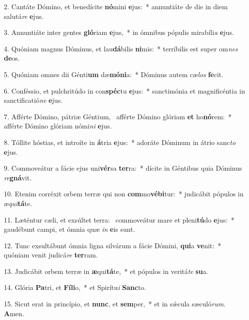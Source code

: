 2. Cantáte Dómino, et benedícite \textbf{nó}mini \textbf{e}jus:~*  annuntiáte de die in diem salutá\textit{re} \textbf{e}jus.\

3. Annuntiáte inter gentes \textbf{gló}riam \textbf{e}jus,~*  in ómnibus pópulis mirabíli\textit{a} \textbf{e}jus.\

4. Quóniam magnus Dóminus, et lau\textbf{dá}bilis \textbf{ni}mis:~*  terríbilis est super om\textit{nes} \textbf{de}os.\

5. Quóniam omnes dii Génti\textbf{um} dæ\textbf{mó}\textbf{ni}a:~*  Dóminus autem cæ\textit{los} \textbf{fe}cit.\

6. Conféssio, et pulchritúdo in con\textbf{spéc}tu \textbf{e}jus:~*  sanctimónia et magnificéntia in sanctificatió\textit{ne} \textbf{e}jus.\

7. Afférte Dómino, pátriæ Géntium, \dag\  afférte Dómino glóriam \textbf{et} ho\textbf{nó}rem:~*  afférte Dómino glóriam nómi\textit{ni} \textbf{e}jus.\

8. Tóllite hóstias, et introíte in \textbf{á}tria \textbf{e}jus:~*  adoráte Dóminum in átrio sanc\textit{to} \textbf{e}jus.\

9. Commoveátur a fácie ejus uni\textbf{vér}sa \textbf{ter}ra:~*  dícite in Géntibus quia Dóminus \textit{re}\textbf{gná}vit.\

10. Etenim corréxit orbem terræ qui non \textbf{com}mo\textbf{vé}\textbf{bi}tur:~*  judicábit pópulos in æ\textit{qui}\textbf{tá}te.\

11. Læténtur cæli, et exsúltet terra: \dag\  commoveátur mare et pleni\textbf{tú}do \textbf{e}jus:~*  gaudébunt campi, et ómnia quæ \textit{in} \textbf{e}is sunt.\

12. Tunc exsultábunt ómnia ligna silvárum a fácie Dómini, \textbf{qui}a \textbf{ve}nit:~*  quóniam venit judicá\textit{re} \textbf{ter}ram.\

13. Judicábit orbem terræ in \textbf{æ}qui\textbf{tá}te,~*  et pópulos in veritá\textit{te} \textbf{su}a.\

14. Glória \textbf{Pa}tri, et \textbf{Fí}\textbf{li}o,~*  et Spirítu\textit{i} \textbf{Sanc}to.\

15. Sicut erat in princípio, et \textbf{nunc}, et \textbf{sem}per,~*  et in sǽcula sæculó\textit{rum}. \textbf{A}men.\

